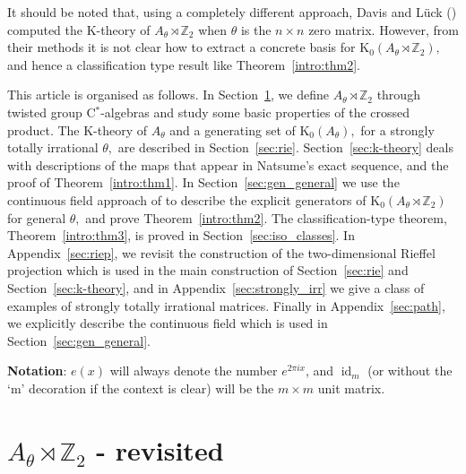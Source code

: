 \documentclass[9pt, BCOR=2mm]{amsart}
\numberwithin{equation}{section}
\numberwithin{equation}{section}
\newcommand{\Z}{{\mathbb{Z}}}
\newcommand{\K}{\mathrm{K}} %
\DeclareMathOperator{\id}{id}
\begin{document}
It should be noted that, using a completely different approach, Davis and L\"uck (\cite{DL13}) computed the K-theory of $A_\theta \rtimes \Z_2$ when $\theta$ is the $n \times n$ zero matrix. However, from their methods it is not clear  how to extract a concrete basis for $\K_0(A_\theta \rtimes \Z_2),$ and hence a classification type result like Theorem~\ref{intro:thm2}.

This article is organised as follows. In Section~\ref{sec:definition}, we define  $A_\theta \rtimes \Z_2$ through twisted group C$^*$-algebras and study some basic properties of the crossed product. The K-theory of $A_\theta$ and a generating set of $\K_0(A_\theta),$ for a strongly totally irrational $\theta,$ are described in Section~\ref{sec:rie}. Section~\ref{sec:k-theory} deals with descriptions of the maps that appear in Natsume's exact sequence, and the proof of  Theorem~\ref{intro:thm1}. In Section~\ref{sec:gen_general} we use the continuous field approach of \cite{ELPW10} to describe the explicit generators of $\K_0(A_\theta\rtimes\Z_2)$ for general $\theta,$ and prove Theorem~\ref{intro:thm2}. The classification-type theorem,  Theorem~\ref{intro:thm3}, is proved in Section~\ref{sec:iso_classes}. In Appendix~\ref{sec:riep}, we revisit the construction of the two-dimensional Rieffel projection which is used in the main construction of Section~\ref{sec:rie} and Section~\ref{sec:k-theory}, and in Appendix~\ref{sec:strongly_irr} we give a class of examples of strongly totally irrational matrices. Finally in Appendix~\ref{sec:path}, we explicitly describe the continuous field which is used in Section~\ref{sec:gen_general}.         
	
	
	
	
	
	\textbf {Notation}: $e(x)$ will always denote the number $e^{2\pi i x}$, and $\id_m$ (or without the `m' decoration if the context is clear) will be the $m\times m$ unit matrix. 
	
	
	
	
	\section{$A_\theta\rtimes \Z_2$ - revisited}\label{sec:definition}
	
\end{document}
